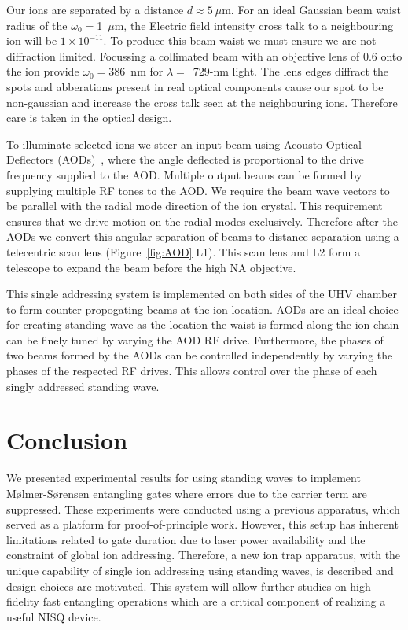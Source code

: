 \documentclass[12pt]{iopart}
\begin{document}
Our ions are separated by a distance $d\approx 5~\mu$m. For an ideal
Gaussian beam waist radius of the $\omega_0 = $1~$\mu$m, the Electric
field intensity cross talk to a neighbouring ion will be
$1\times 10^{-11}$. To produce this beam waist we must ensure we are not
diffraction limited.  Focussing a collimated beam with an objective
lens of 0.6 onto the ion provide $\omega_0 = 386$~nm for
$\lambda=$~729-nm light. The lens edges diffract the spots and
abberations present in real optical components cause our spot to be
non-gaussian and increase the cross talk seen at the neighbouring
ions. Therefore care is taken in the optical design.

To illuminate selected ions we steer an input beam using
Acousto-Optical-Deflectors (AODs)~\cite{nagourney_quantum_2014, li_low-crosstalk_2023, pogorelov_compact_2021}, where the
angle deflected is
proportional to the drive frequency supplied to the AOD. Multiple
output beams can be formed by supplying multiple RF tones to the AOD.
We require the beam wave vectors to be
parallel with the radial mode direction of the ion crystal. This
requirement ensures that we drive motion on the radial modes
exclusively. Therefore after the AODs we convert this angular
separation of beams to distance separation using a telecentric scan
lens (Figure~\ref{fig:AOD} L1).
This scan lens and L2 form a telescope to expand the beam before the
high NA objective.

This single addressing system is implemented on both sides of the UHV
chamber to form counter-propogating beams at the ion location. AODs are
an ideal choice for creating standing wave as the location the waist
is formed along the ion chain can be finely tuned by varying the AOD RF
drive. Furthermore, the phases of two beams formed by the AODs can be
controlled independently by varying the phases of the respected RF
drives. This allows control over the phase of each singly addressed
standing wave.\\


\section{Conclusion}
We presented experimental results for using standing waves to
implement M\o lmer-S\o rensen entangling gates where errors due to the
carrier term are suppressed. These experiments were conducted using a
previous apparatus, which served as a platform for proof-of-principle
work. However, this setup has inherent limitations related to gate
duration due to laser power availability and the constraint of global
ion addressing.
Therefore, a new ion trap apparatus, with the unique capability of
single ion addressing using standing waves, is described and design
choices are motivated. This system will allow further studies on high
fidelity fast entangling operations which are a critical component of
realizing a useful NISQ device.
\end{document}
